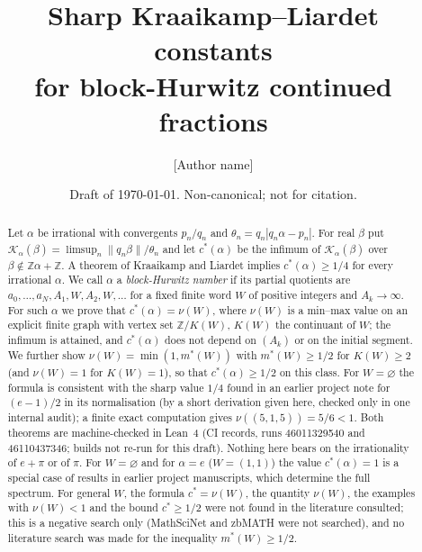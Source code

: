 \documentclass[11pt]{amsart}
\theoremstyle{definition}
\theoremstyle{remark}
\newcommand{\Z}{\mathbb{Z}}
\newcommand{\dist}[1]{\lVert #1\rVert}
\newcommand{\KL}{\mathcal{K}}
\begin{document}
\title[Sharp KL constants for block-Hurwitz continued fractions]{Sharp Kraaikamp--Liardet constants\\ for block-Hurwitz continued fractions}

\author{[Author name]}
\date{Draft of \today. Non-canonical; not for citation.}

\begin{abstract}
Let $\alpha$ be irrational with convergents $p_n/q_n$ and $\theta_n=q_n|q_n\alpha-p_n|$. For real $\beta$
put $\KL_\alpha(\beta)=\limsup_n\dist{q_n\beta}/\theta_n$ and let $c^*(\alpha)$ be the infimum of
$\KL_\alpha(\beta)$ over $\beta\notin\Z\alpha+\Z$. A theorem of Kraaikamp and Liardet implies
$c^*(\alpha)\ge1/4$ for every irrational $\alpha$. We call $\alpha$ a \emph{block-Hurwitz number} if its
partial quotients are $a_0,\dots,a_N,A_1,W,A_2,W,\dots$ for a fixed finite word $W$ of positive
integers and $A_k\to\infty$. For such $\alpha$ we prove that $c^*(\alpha)=\nu(W)$, where $\nu(W)$ is a
min--max value on an explicit finite graph with vertex set $\Z/K(W)$, $K(W)$ the continuant of $W$;
the infimum is attained, and $c^*(\alpha)$ does not depend on $(A_k)$ or on the initial segment. We
further show $\nu(W)=\min(1,m^*(W))$ with $m^*(W)\ge1/2$ for $K(W)\ge2$ (and $\nu(W)=1$ for $K(W)=1$), so that $c^*(\alpha)\ge1/2$ on this class.
For $W=\varnothing$ the formula is consistent with the sharp value $1/4$ found in an earlier project note
for $(e-1)/2$ in its normalisation (by a short derivation given here, checked only in one internal audit); a
finite exact computation gives $\nu((5,1,5))=5/6<1$. Both theorems are machine-checked in Lean~4 (CI records,
runs 46011329540 and 46110437346; builds not re-run for this draft). Nothing here bears on the irrationality of $e+\pi$ or of $\pi$.
For $W=\varnothing$ and for $\alpha=e$ ($W=(1,1)$) the value $c^*(\alpha)=1$ is a special case of results in
earlier project manuscripts, which determine the full spectrum. For general $W$, the formula
$c^*=\nu(W)$, the quantity $\nu(W)$, the examples with $\nu(W)<1$ and the bound $c^*\ge1/2$ were not found in the
literature consulted; this is a negative search only (MathSciNet and zbMATH were not searched), and no
literature search was made for the inequality $m^*(W)\ge1/2$.
\end{abstract}

\maketitle
\end{document}
